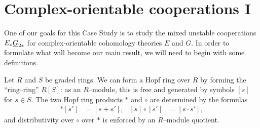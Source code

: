 











\section{Complex-orientable cooperations I}

One of our goals for this Case Study is to study the mixed unstable cooperations $E_* \underline{\smash{G}}_{2*}$ for complex-orientable cohomology theories $E$ and $G$.  In order to formulate what will become our main result, we will need to begin with some definitions.

\begin{definition}
Let $R$ and $S$ be graded rings.  We can form a Hopf ring over $R$ by forming the ``ring--ring'' $R[S]$: as an $R$--module, this is free and generated by symbols $[s]$ for $s \in S$.  The two Hopf ring products $\ast$ and $\circ$ are determined by the formulas
\begin{align*}
[s] \ast [s'] & = [s + s'], &
[s] \circ [s'] & = [s \cdot s'],
\end{align*}
and distributivity over $\circ$ over $\ast$ is enforced by an $R$--module quotient.
\end{definition}

